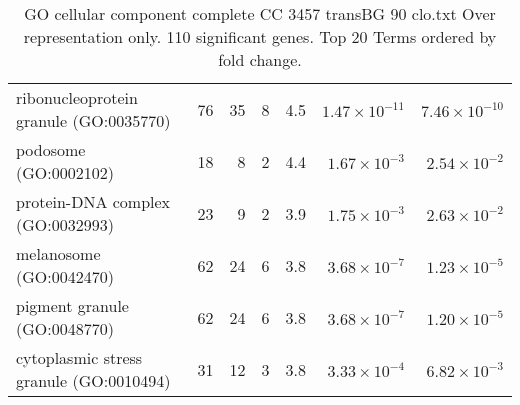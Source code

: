 \begin{table}[ht]
\begin{adjustbox}{width=\textwidth}
\begin{tabular}{lrrrrrr}
  ribonucleoprotein granule (GO:0035770) & 76 & 35 & 8 & 4.5 & $1.47 \times 10^{-11}$ & $7.46 \times 10^{-10}$ \\ 
  podosome (GO:0002102) & 18 & 8 & 2 & 4.4 & $1.67 \times 10^{-3}$ & $2.54 \times 10^{-2}$ \\ 
  protein-DNA complex (GO:0032993) & 23 & 9 & 2 & 3.9 & $1.75 \times 10^{-3}$ & $2.63 \times 10^{-2}$ \\ 
  melanosome (GO:0042470) & 62 & 24 & 6 & 3.8 & $3.68 \times 10^{-7}$ & $1.23 \times 10^{-5}$ \\ 
  pigment granule (GO:0048770) & 62 & 24 & 6 & 3.8 & $3.68 \times 10^{-7}$ & $1.20 \times 10^{-5}$ \\ 
  cytoplasmic stress granule (GO:0010494) & 31 & 12 & 3 & 3.8 & $3.33 \times 10^{-4}$ & $6.82 \times 10^{-3}$ \\ 
   \hline
\end{tabular}
\end{adjustbox}
\caption{GO cellular component complete CC 3457 transBG 90 clo.txt Over representation only. 110 significant genes. Top 20 Terms ordered by fold change. } 
\label{tab:GO cellular component complete CC 3457 transBG 90 clo.txt Over representation only. 110 significant genes. Top 20 Terms ordered by fold change. }
\end{table}


